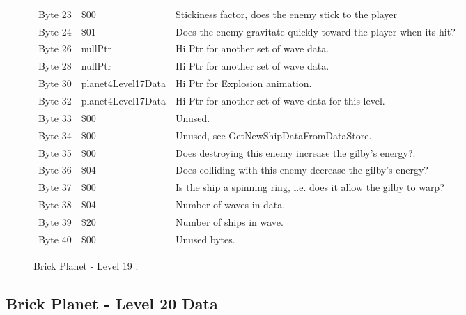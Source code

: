 \begin{figure}[H]
{\begin{adjustbox}{width=12cm}
\begin{tabular}{lll}
 Byte 23 & \$00                        & Stickiness factor, does the enemy stick to the player              \\
 Byte 24 & \$01                        & Does the enemy gravitate quickly toward the player when its hit?   \\
 Byte 26 & nullPtr                    & Hi Ptr for another set of wave data.                               \\
 Byte 28 & nullPtr                    & Hi Ptr for another set of wave data.                               \\
 Byte 30 & planet4Level17Data         & Hi Ptr for Explosion animation.                                    \\
 Byte 32 & planet4Level17Data         & Hi Ptr for another set of wave data for this level.                \\
 Byte 33 & \$00                        & Unused.                                                            \\
 Byte 34 & \$00                        & Unused, see GetNewShipDataFromDataStore.                           \\
 Byte 35 & \$00                        & Does destroying this enemy increase the gilby's energy?.           \\
 Byte 36 & \$04                        & Does colliding with this enemy decrease the gilby's energy?        \\
 Byte 37 & \$00                        & Is the ship a spinning ring, i.e. does it allow the gilby to warp? \\
 Byte 38 & \$04                        & Number of waves in data.                                           \\
 Byte 39 & \$20                        & Number of ships in wave.                                           \\
 Byte 40 & \$00                        & Unused bytes.                                                      \\
\bottomrule
\end{tabular}

  \end{adjustbox}

  }\caption*{Brick Planet - Level 19
.}
\end{figure}

\clearpage
\subsection{Brick Planet - Level 20 Data}

